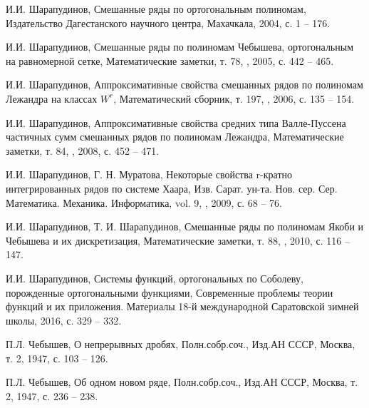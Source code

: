 \begin{thebibliography}{999}

И.И. Шарапудинов,
Смешанные ряды по ортогональным полиномам,
Издательство Дагестанского научного центра, Махачкала, 2004, с. 1 -- 176.




И.И. Шарапудинов,
Смешанные ряды по полиномам Чебышева, ортогональным на равномерной сетке,
Математические заметки, т. 78, , 2005, с. 442 -- 465.




И.И. Шарапудинов,
Аппроксимативные свойства смешанных рядов по полиномам Лежандра на классах $W^r$,
Математический сборник, т. 197, , 2006, с. 135 -- 154.



И.И. Шарапудинов,
Аппроксимативные свойства средних типа Валле-Пуссена частичных сумм смешанных рядов по полиномам Лежандра,
Математические заметки, т. 84, , 2008, с. 452 -- 471.



 И.И. Шарапудинов,  Г. Н. Муратова,
Некоторые свойства r-кратно интегрированных рядов по системе Хаара,
Изв. Сарат. ун-та. Нов. сер. Сер. Математика. Механика. Информатика, vol. 9, , 2009, с. 68 -- 76.



И.И. Шарапудинов, Т. И. Шарапудинов,
Смешанные ряды по полиномам Якоби и Чебышева и их дискретизация,
Математические заметки, т. 88, , 2010, с. 116 -- 147.




И.И. Шарапудинов,
Системы функций, ортогональных по Соболеву, порожденные ортогональными функциями,
Современные проблемы теории функций и их приложения.  Материалы 18-й международной Саратовской зимней школы,
2016, с. 329 -- 332.



П.Л. Чебышев,
О непрерывных дробях, Полн.собр.соч., Изд.АН СССР, Москва, т. 2, 1947, с. 103 -- 126.



П.Л. Чебышев,
Об одном новом ряде, Полн.собр.соч., Изд.АН СССР, Москва, т. 2, 1947, с. 236 -- 238.



\end{thebibliography}
